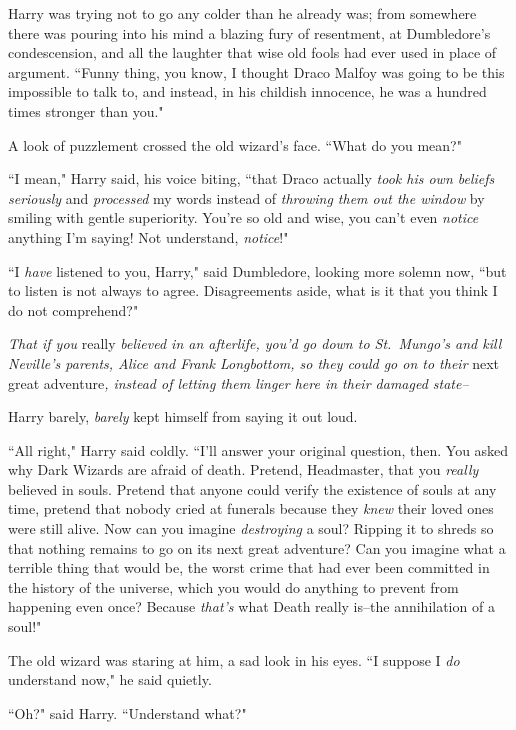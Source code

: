 Harry was trying not to go any colder than he already was; from somewhere there was pouring into his mind a blazing fury of resentment, at Dumbledore's condescension, and all the laughter that wise old fools had ever used in place of argument. ``Funny thing, you know, I thought Draco Malfoy was going to be this impossible to talk to, and instead, in his childish innocence, he was a hundred times stronger than you."

A look of puzzlement crossed the old wizard's face. ``What do you mean?"

``I mean," Harry said, his voice biting, ``that Draco actually \emph{took his own beliefs seriously} and \emph{processed} my words instead of \emph{throwing them out the window} by smiling with gentle superiority. You're so old and wise, you can't even \emph{notice} anything I'm saying! Not understand, \emph{notice}!"

``I \emph{have} listened to you, Harry," said Dumbledore, looking more solemn now, ``but to listen is not always to agree. Disagreements aside, what is it that you think I do not comprehend?"

\emph{That if you} really \emph{believed in an afterlife, you'd go down to St.~Mungo's and kill Neville's parents, Alice and Frank Longbottom, so they could go on to their} next great adventure\emph{, instead of letting them linger here in their damaged state\---}

Harry barely, \emph{barely} kept himself from saying it out loud.

``All right," Harry said coldly. ``I'll answer your original question, then. You asked why Dark Wizards are afraid of death. Pretend, Headmaster, that you \emph{really} believed in souls. Pretend that anyone could verify the existence of souls at any time, pretend that nobody cried at funerals because they \emph{knew} their loved ones were still alive. Now can you imagine \emph{destroying} a soul? Ripping it to shreds so that nothing remains to go on its next great adventure? Can you imagine what a terrible thing that would be, the worst crime that had ever been committed in the history of the universe, which you would do anything to prevent from happening even once? Because \emph{that's} what Death really is\---the annihilation of a soul!"

The old wizard was staring at him, a sad look in his eyes. ``I suppose I \emph{do} understand now," he said quietly.

``Oh?" said Harry. ``Understand what?"

